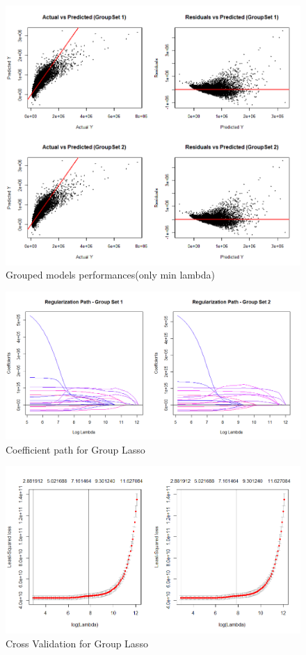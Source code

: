 \documentclass[a4paper, 11pt]{article}
\begin{document}
\begin{figure}[H]
\includegraphics[scale=0.65]{gglassoperf}
\centering
\caption{Grouped models performances(only min lambda)}
\label{fig:gglassoperf}
\end{figure}

\begin{figure}[H]
\includegraphics[scale=0.55]{gglassocoefpath}
\centering
\caption{Coefficient path for Group Lasso}
\label{fig:gglassocoefpath}
\end{figure}

\begin{figure}[H]
\includegraphics[scale=0.65]{gglassocv}
\centering
\caption{Cross Validation for Group Lasso}
\label{fig:gglassocv}
\end{figure}
\end{document}

